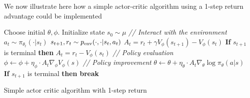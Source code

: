 We now illustrate here how a simple actor-critic algorithm using a 1-step return advantage could be implemented

\begin{algorithm}
\begin{algorithmic}[1]
\STATE Choose initial $\theta, \phi$.
    \STATE Initialize state $s_0 \sim \mu$
        \STATE \textit{// Interact with the environment}
        \STATE $a_t \sim \pi_{\theta_t}(\cdot | s_t)$
        \STATE $s_{t+1}, r_t \sim p_{\text{env}}(\cdot, \cdot | s_t, a_t)$
        \STATE $A_t = r_t + \gamma V_\phi(s_{t+1}) - V_\phi(s_t)$
        \STATE \textbf{If} $s_{t+1}$ is terminal \textbf{then }$A_t = r_t - V_\phi(s_t)$ 
        \STATE \textit{// Policy evaluation}
        \STATE $\phi \leftarrow \phi + \eta_{\phi} \cdot A_t \nabla_{\phi}V_{\phi}(s) $
        \STATE \textit{// Policy improvement}
        \STATE $\theta \leftarrow \theta + \eta_{\theta} \cdot A_t \nabla_{\theta} \log \pi_{\theta}(a|s)$ 
        \STATE \textbf{If} $s_{t+1}$ is terminal \textbf{then break}
    \ENDFOR
\ENDFOR
\end{algorithmic}
\caption{Simple actor critic algorithm with 1-step return}
\label{alg:ac_methods}
\end{algorithm}



